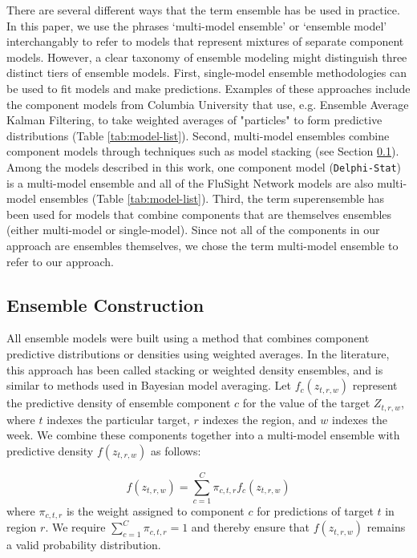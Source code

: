 \documentclass{article}\usepackage[]{graphicx}\usepackage[]{color}
\begin{document}
There are several different ways that the term ensemble has be used in practice. 
In this paper, we use the phrases `multi-model ensemble' or `ensemble model' interchangably to refer to models that represent mixtures of separate component models. 
However, a clear taxonomy of ensemble modeling might distinguish three distinct tiers of ensemble models. 
First, single-model ensemble methodologies can be used to fit models and make predictions. 
Examples of these approaches include the component models from Columbia University that use, e.g. Ensemble Average Kalman Filtering, to take weighted averages of "particles" to form predictive distributions (Table \ref{tab:model-list}).
Second, multi-model ensembles combine component models through techniques such as model stacking (see Section \ref{sec:stacking}).
Among the models described in this work, one component model ({\tt Delphi-Stat}) is a multi-model ensemble and all of the FluSight Network models are also multi-model ensembles (Table \ref{tab:model-list}).
Third, the term superensemble has been used for models that combine components that are themselves ensembles (either multi-model or single-model)\cite{krishnamurti1999improved,Yamana2016}.
Since not all of the components in our approach are ensembles themselves, we chose the term multi-model ensemble to refer to our approach.

\subsection{Ensemble Construction} \label{sec:stacking}

All ensemble models were built using a method that combines component predictive distributions or densities using weighted averages. In the literature, this approach has been called stacking\cite{Wolpert1992} or weighted density ensembles\cite{Ray2018}, and is similar to methods used in Bayesian model averaging\cite{Raftery2005}. Let $f_c(z_{t,r,w})$ represent the predictive density of ensemble component $c$ for the value of the target $Z_{t,r,w}$, where $t$ indexes the particular target, $r$ indexes the region, and $w$ indexes the week. We combine these components together into a multi-model ensemble with predictive density $f(z_{t,r,w})$ as follows:

\begin{equation}
f(z_{t,r,w})  = \sum^C_{c = 1} \pi_{c,t,r} f_c(z_{t,r,w})
\label{eq:enseq}
\end{equation}
where $\pi_{c, t, r}$ is the weight assigned to component $c$ for predictions of target $t$ in region $r$. We require $\sum^C_{c = 1} \pi_{c,t,r} = 1$ and thereby ensure that $f(z_{t,r,w})$ remains a valid probability distribution. 
\end{document}
